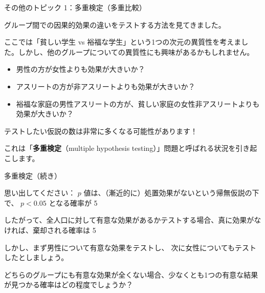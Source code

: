 \documentclass[11pt,handout]{beamer}
\newenvironment{wideitemize}{\itemize\addtolength{\itemsep}{10pt}}{\enditemize}
\begin{document}
\begin{frame}{その他のトピック 1：多重検定（多重比較）}
	\begin{wideitemize}
		\item
		グループ間での因果的効果の違いをテストする方法を見てきました。
		
		\pause
		\item
		ここでは「貧しい学生 vs 裕福な学生」という1つの次元の異質性を考えました。しかし、他のグループについての異質性にも興味があるかもしれません。 \smallskip
			\begin{itemize}
				\item
				男性の方が女性よりも効果が大きいか？ \smallskip
				
				\pause
				\item
				アスリートの方が非アスリートよりも効果が大きいか？ \smallskip
				
				\pause
				\item
				裕福な家庭の男性アスリートの方が、貧しい家庭の女性非アスリートよりも効果が大きいか？
		   \end{itemize}
	   
	  \pause
	  \item
	  テストしたい仮説の数は非常に多くなる可能性があります！
	  
	  \pause
	  \item
	  これは「\textbf{多重検定}（multiple hypothesis testing）」問題と呼ばれる状況を引き起こします。
	\end{wideitemize}	
\end{frame}


\begin{frame}{多重検定（続き）}
	\begin{wideitemize}
		\item
		思い出してください： $p$ 値は、（漸近的に）処置効果がないという帰無仮説の下で、 $p < 0.05$ となる確率が 5%
		
		\pause
		\item
		したがって、全人口に対して有意な効果があるかテストする場合、真に効果がなければ、棄却される確率は 5%
		
		\pause
		\item
		しかし、まず男性について有意な効果をテストし、
		次に女性についてもテストしたとしましょう。
		
		\pause
		\item
		どちらのグループにも有意な効果が全くない場合、少なくとも1つの有意な結果が見つかる確率はどの程度でしょうか？

	\end{wideitemize}
\end{frame}
\end{document}
